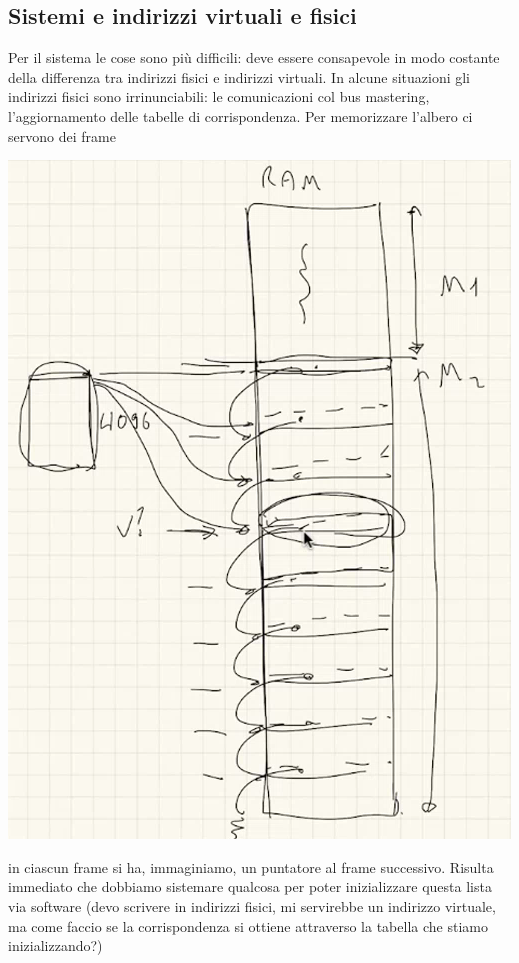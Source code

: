 \documentclass[11pt]{report}
\theoremstyle{definition}
\begin{document}
 \subsection{Sistemi e indirizzi virtuali e fisici}
 Per il sistema le cose sono più difficili: deve essere consapevole in modo costante della differenza tra indirizzi fisici e indirizzi virtuali. In alcune situazioni gli indirizzi fisici sono irrinunciabili: le comunicazioni col bus mastering, l'aggiornamento delle tabelle di corrispondenza. Per memorizzare l'albero ci servono dei frame
 	\begin{center}
 	\includegraphics[scale=.7]{img/217.PNG}
 \end{center}
 in ciascun frame si ha, immaginiamo, un puntatore al frame successivo. Risulta immediato che dobbiamo sistemare qualcosa per poter inizializzare questa lista via software (devo scrivere in indirizzi fisici, mi servirebbe un indirizzo virtuale, ma come faccio se la corrispondenza si ottiene attraverso la tabella che stiamo inizializzando?)
 
\end{document}
